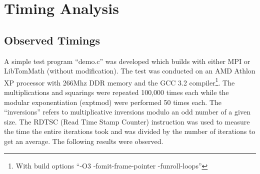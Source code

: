 \documentclass{article}
\begin{document}
\section{Timing Analysis}
\subsection{Observed Timings}
A simple test program ``demo.c'' was developed which builds with either MPI or LibTomMath (without modification).  The
test was conducted on an AMD Athlon XP processor with 266Mhz DDR memory and the GCC 3.2 compiler\footnote{With build
options ``-O3 -fomit-frame-pointer -funroll-loops''}.    The multiplications and squarings were repeated 100,000 times 
each while the modular exponentiation (exptmod) were performed 50 times each.  The ``inversions'' refers to multiplicative
inversions modulo an odd number of a given size.  The RDTSC (Read Time Stamp Counter) instruction was used to measure the 
time the entire iterations took and was divided by the number of iterations to get an average.  The following results 
were observed.
\end{document}
